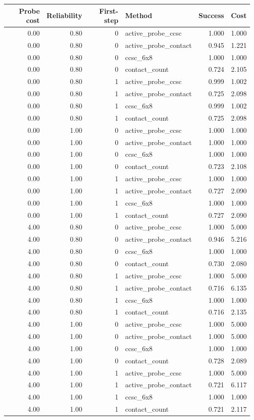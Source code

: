 \begin{tabular}{rrrlrr}
\toprule
Probe cost & Reliability & First-step & Method & Success & Cost \\
\midrule
0.00 & 0.80 & 0 & active\_probe\_ccsc & 1.000 & 1.000 \\
0.00 & 0.80 & 0 & active\_probe\_contact & 0.945 & 1.221 \\
0.00 & 0.80 & 0 & ccsc\_6x8 & 1.000 & 1.000 \\
0.00 & 0.80 & 0 & contact\_count & 0.724 & 2.105 \\
0.00 & 0.80 & 1 & active\_probe\_ccsc & 0.999 & 1.002 \\
0.00 & 0.80 & 1 & active\_probe\_contact & 0.725 & 2.098 \\
0.00 & 0.80 & 1 & ccsc\_6x8 & 0.999 & 1.002 \\
0.00 & 0.80 & 1 & contact\_count & 0.725 & 2.098 \\
0.00 & 1.00 & 0 & active\_probe\_ccsc & 1.000 & 1.000 \\
0.00 & 1.00 & 0 & active\_probe\_contact & 1.000 & 1.000 \\
0.00 & 1.00 & 0 & ccsc\_6x8 & 1.000 & 1.000 \\
0.00 & 1.00 & 0 & contact\_count & 0.723 & 2.108 \\
0.00 & 1.00 & 1 & active\_probe\_ccsc & 1.000 & 1.000 \\
0.00 & 1.00 & 1 & active\_probe\_contact & 0.727 & 2.090 \\
0.00 & 1.00 & 1 & ccsc\_6x8 & 1.000 & 1.000 \\
0.00 & 1.00 & 1 & contact\_count & 0.727 & 2.090 \\
4.00 & 0.80 & 0 & active\_probe\_ccsc & 1.000 & 5.000 \\
4.00 & 0.80 & 0 & active\_probe\_contact & 0.946 & 5.216 \\
4.00 & 0.80 & 0 & ccsc\_6x8 & 1.000 & 1.000 \\
4.00 & 0.80 & 0 & contact\_count & 0.730 & 2.080 \\
4.00 & 0.80 & 1 & active\_probe\_ccsc & 1.000 & 5.000 \\
4.00 & 0.80 & 1 & active\_probe\_contact & 0.716 & 6.135 \\
4.00 & 0.80 & 1 & ccsc\_6x8 & 1.000 & 1.000 \\
4.00 & 0.80 & 1 & contact\_count & 0.716 & 2.135 \\
4.00 & 1.00 & 0 & active\_probe\_ccsc & 1.000 & 5.000 \\
4.00 & 1.00 & 0 & active\_probe\_contact & 1.000 & 5.000 \\
4.00 & 1.00 & 0 & ccsc\_6x8 & 1.000 & 1.000 \\
4.00 & 1.00 & 0 & contact\_count & 0.728 & 2.089 \\
4.00 & 1.00 & 1 & active\_probe\_ccsc & 1.000 & 5.000 \\
4.00 & 1.00 & 1 & active\_probe\_contact & 0.721 & 6.117 \\
4.00 & 1.00 & 1 & ccsc\_6x8 & 1.000 & 1.000 \\
4.00 & 1.00 & 1 & contact\_count & 0.721 & 2.117 \\
\bottomrule
\end{tabular}
